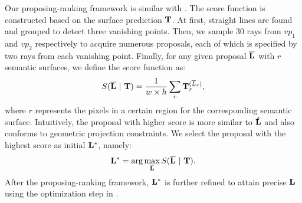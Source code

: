 Our proposing-ranking framework is similar with \cite{hedau2009recovering}.
The score function is constructed based on the surface prediction $\mathbf{T}$. 
At first, straight lines are found and grouped to detect three vanishing points. 
Then, we sample 30 rays from $vp_1$ and $vp_2$ respectively to acquire numerous proposals, each of which is specified by two rays from each vanishing point. Finally, for any given proposal $\mathbf{\overline{L}}$ with $r$ semantic surfaces, we define the score function as:
%
\begin{equation}
\label{eq:scorefunction}
S(\mathbf{\overline{L}}~|~\mathbf{T}) = \frac{1}{w\times h}\sum_r \mathbf{T}_r^{(\overline{L}_r)},
\end{equation}
%
where $r$ represents the pixels in a certain region for the corresponding semantic surface. Intuitively, the proposal with higher score is more similar to $\mathbf{\hat{L}}$ and also conforms to geometric projection constraints. We select the proposal with the highest score as initial $\mathbf{L^*}$, namely:
%
\begin{equation}
\label{eq:initial}
\mathbf{L^*} = \arg\max_{\mathbf{\overline{L}}} S(\mathbf{\overline{L}}~|~\mathbf{T}).
\end{equation}
%
After the proposing-ranking framework, $\mathbf{L^*}$ is further refined to attain precise $\mathbf{L}$ using the optimization step in \cite{dasgupta2016delay}.


